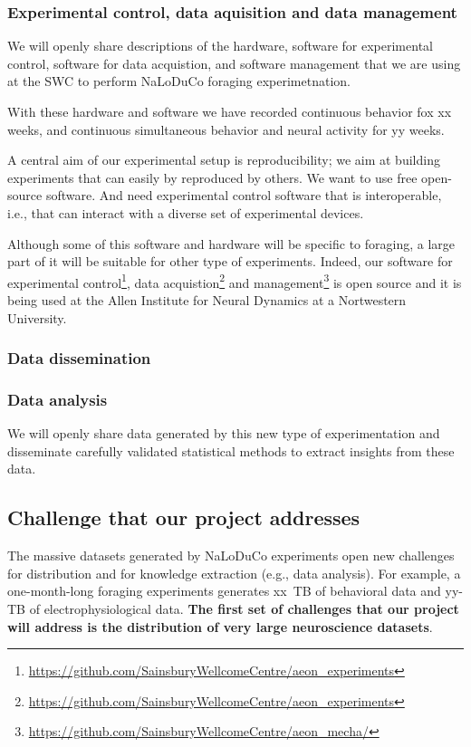 \subsubsection{Experimental control, data aquisition and data management}

We will openly share descriptions of the hardware, software for experimental
control, software for data acquistion, and software management that we are
using at the SWC to perform NaLoDuCo foraging experimetnation.


%
With these hardware and software we have recorded continuous behavior fox xx
weeks, and continuous simultaneous behavior and neural activity for yy weeks.

A central aim of our experimental setup is reproducibility; we aim at building
experiments that can easily by reproduced by others.
%
We want to use free open-source software.
%
And need experimental control software that is interoperable, i.e., that can
interact with a diverse set of experimental devices.

Although some of this software and hardware will be specific to foraging, a
large part of it will be suitable for other type of experiments.
%
Indeed, our software for experimental
control\footnote{\url{https://github.com/SainsburyWellcomeCentre/aeon_experiments}},
data
acquistion\footnote{\url{https://github.com/SainsburyWellcomeCentre/aeon_experiments}}
and
management\footnote{\url{https://github.com/SainsburyWellcomeCentre/aeon_mecha/}}
is open source and it is being used at the Allen Institute for Neural Dynamics
at a Nortwestern University.

\subsubsection{Data dissemination}

\subsubsection{Data analysis}

%
We will openly share data generated by this new type of experimentation
and disseminate carefully validated statistical methods to extract insights from
these data.

\subsection{Challenge that our project addresses}

The massive datasets generated by NaLoDuCo
experiments open new challenges for distribution and for knowledge extraction
(e.g., data analysis). For example, a one-month-long foraging experiments
generates xx~TB of behavioral data and yy-TB of electrophysiological data.
%
\textbf{The first set of challenges that our project will address is the
distribution of very large neuroscience datasets}.

